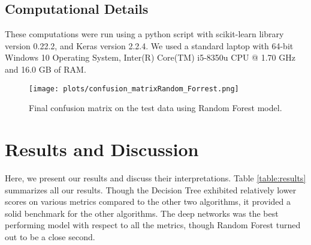 \documentclass[sigconf]{acmart}
\begin{document}
\subsection{Computational Details}
These computations were run using a python script with scikit-learn library \cite{scikit-learn} version 0.22.2, and Keras \cite{chollet2015keras} version 2.2.4. We used a standard laptop with 64-bit Windows 10 Operating System, Inter(R) Core(TM) i5-8350u CPU @ 1.70 GHz and 16.0 GB of RAM.
\begin{figure*}[]
    \centering
    \texttt{[image: plots/confusion\_matrixRandom\_Forrest.png]}
    \caption{Final confusion matrix on the test data using Random Forest model.}
    \label{fig:conf_mat}
\end{figure*}
\section{Results and Discussion}\label{sec:results_discussion}
Here, we present our results and discuss their interpretations. Table \ref{table:results} summarizes all our results. Though the Decision Tree exhibited relatively lower scores on various metrics compared to the other two algorithms, it provided a solid benchmark for the other algorithms. The deep networks was the best performing model with respect to all the metrics, though Random Forest turned out to be a close second. 
\end{document}
